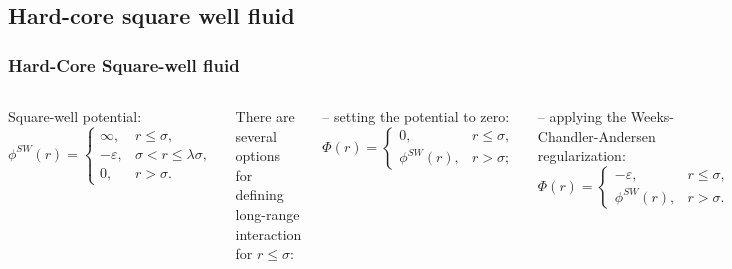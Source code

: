 \documentclass[8pt]{beamer}
\begin{document}
	\subsection{Hard-core square well fluid}
	
	\begin{frame}
		\frametitle{Hard-Core Square-well fluid}
		
		\begin{columns}
			Square-well potential: 
			\begin{equation*}
				\label{def:sw}
				\phi^{SW}(r) = \left\{
				\begin{array}{llll}
					\infty, & r\leq \sigma,
					\\
					-\varepsilon, & \sigma < r \leq \lambda\sigma,
					\\
					0, & r > \sigma.
				\end{array}
				\right.
			\end{equation*}
			
			There are several options for defining long-range interaction for $r\leq \sigma$:
			\hfill
			\\
			\hfill
			
			-- setting the potential to zero:			
			\begin{equation*}
				\Phi(r) = \left\{
				\begin{array}{cc}
					0, & r \leq \sigma, 
					\\
					\phi^{SW}(r), & r > \sigma;
				\end{array}
				\right.
			\end{equation*}
			
			-- applying the Weeks-Chandler-Andersen regularization:			
			\begin{equation*}
				\Phi(r) = \left\{
				\begin{array}{cc}
					-\varepsilon, & r \leq \sigma, 
					\\
					\phi^{SW}(r), & r > \sigma.
				\end{array}
				\right.
			\end{equation*}
			
			\textit{Weeks, Chandler, Andersen, J. Chem. Phys. \textbf{54}, 5237 (1971)}
			
			\textit{Patsahan, Kozlovskii, Melnyk, J. Phys. Condens. Matter, \textbf{12}, 1595 (2000)}
			

\end{columns}
\end{frame}
\end{document}
